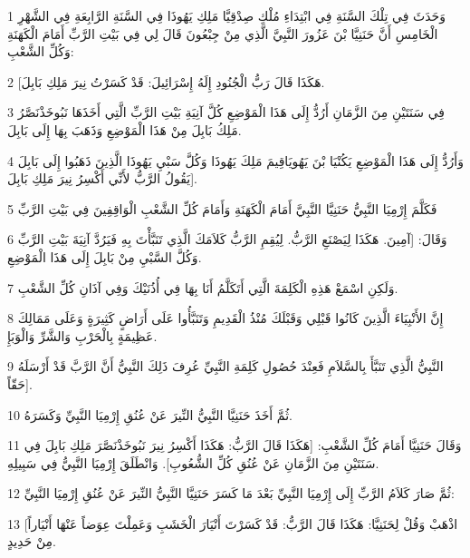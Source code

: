 \par 1 وَحَدَثَ فِي تِلْكَ السَّنَةِ فِي ابْتِدَاءِ مُلْكِ صِدْقِيَّا مَلِكِ يَهُوذَا فِي السَّنَةِ الرَّابِعَةِ فِي الشَّهْرِ الْخَامِسِ أَنَّ حَنَنِيَّا بْنَ عَزُورَ النَّبِيَّ الَّذِي مِنْ جِبْعُونَ قَالَ لِي فِي بَيْتِ الرَّبِّ أَمَامَ الْكَهَنَةِ وَكُلِّ الشَّعْبِ:
\par 2 [هَكَذَا قَالَ رَبُّ الْجُنُودِ إِلَهُ إِسْرَائِيلَ: قَدْ كَسَرْتُ نِيرَ مَلِكِ بَابِلَ.
\par 3 فِي سَنَتَيْنِ مِنَ الزَّمَانِ أَرُدُّ إِلَى هَذَا الْمَوْضِعِ كُلَّ آنِيَةِ بَيْتِ الرَّبِّ الَّتِي أَخَذَهَا نَبُوخَذْنَصَّرُ مَلِكُ بَابِلَ مِنْ هَذَا الْمَوْضِعِ وَذَهَبَ بِهَا إِلَى بَابِلَ.
\par 4 وَأَرُدُّ إِلَى هَذَا الْمَوْضِعِ يَكُنْيَا بْنَ يَهُويَاقِيمَ مَلِكَ يَهُوذَا وَكُلَّ سَبْيِ يَهُوذَا الَّذِينَ ذَهَبُوا إِلَى بَابِلَ يَقُولُ الرَّبُّ لأَنِّي أَكْسِرُ نِيرَ مَلِكِ بَابِلَ].
\par 5 فَكَلَّمَ إِرْمِيَا النَّبِيُّ حَنَنِيَّا النَّبِيَّ أَمَامَ الْكَهَنَةِ وَأَمَامَ كُلِّ الشَّعْبِ الْوَاقِفِينَ فِي بَيْتِ الرَّبِّ
\par 6 وَقَالَ: [آمِينَ. هَكَذَا لِيَصْنَعِ الرَّبُّ. لِيُقِمِ الرَّبُّ كَلاَمَكَ الَّذِي تَنَبَّأْتَ بِهِ فَيَرُدَّ آنِيَةَ بَيْتِ الرَّبِّ وَكُلَّ السَّبْيِ مِنْ بَابِلَ إِلَى هَذَا الْمَوْضِعِ.
\par 7 وَلَكِنِ اسْمَعْ هَذِهِ الْكَلِمَةَ الَّتِي أَتَكَلَّمُ أَنَا بِهَا فِي أُذُنَيْكَ وَفِي آذَانِ كُلِّ الشَّعْبِ.
\par 8 إِنَّ الأَنْبِيَاءَ الَّذِينَ كَانُوا قَبْلِي وَقَبْلَكَ مُنْذُ الْقَدِيمِ وَتَنَبَّأُوا عَلَى أَرَاضٍ كَثِيرَةٍ وَعَلَى مَمَالِكَ عَظِيمَةٍ بِالْحَرْبِ وَالشَّرِّ وَالْوَبَإِ.
\par 9 النَّبِيُّ الَّذِي تَنَبَّأَ بِالسَّلاَمِ فَعِنْدَ حُصُولِ كَلِمَةِ النَّبِيِّ عُرِفَ ذَلِكَ النَّبِيُّ أَنَّ الرَّبَّ قَدْ أَرْسَلَهُ حَقّاً].
\par 10 ثُمَّ أَخَذَ حَنَنِيَّا النَّبِيُّ النِّيرَ عَنْ عُنُقِ إِرْمِيَا النَّبِيِّ وَكَسَرَهُ.
\par 11 وَقَالَ حَنَنِيَّا أَمَامَ كُلِّ الشَّعْبِ: [هَكَذَا قَالَ الرَّبُّ: هَكَذَا أَكْسِرُ نِيرَ نَبُوخَذْنَصَّرَ مَلِكِ بَابِلَ فِي سَنَتَيْنِ مِنَ الزَّمَانِ عَنْ عُنُقِ كُلِّ الشُّعُوبِ]. وَانْطَلَقَ إِرْمِيَا النَّبِيُّ فِي سَبِيلِهِ.
\par 12 ثُمَّ صَارَ كَلاَمُ الرَّبِّ إِلَى إِرْمِيَا النَّبِيِّ بَعْدَ مَا كَسَرَ حَنَنِيَّا النَّبِيُّ النِّيرَ عَنْ عُنُقِ إِرْمِيَا النَّبِيِّ:
\par 13 [اذْهَبْ وَقُلْ لِحَنَنِيَّا: هَكَذَا قَالَ الرَّبُّ: قَدْ كَسَرْتَ أَنْيَارَ الْخَشَبِ وَعَمِلْتَ عِوَضاً عَنْهَا أَنْيَاراً مِنْ حَدِيدٍ.
